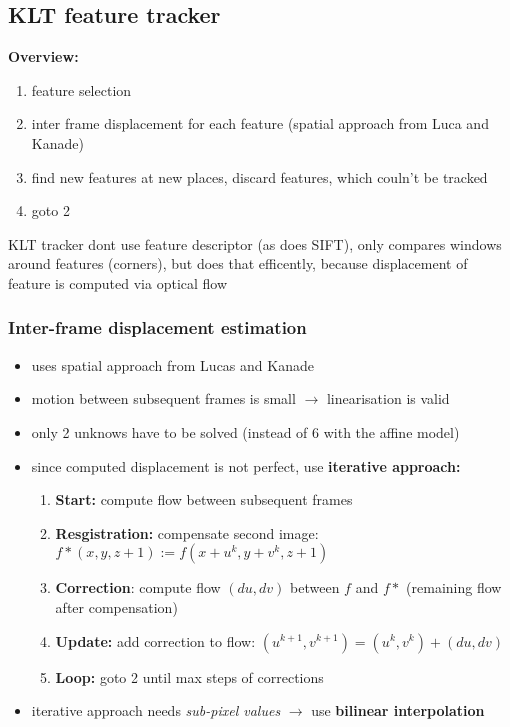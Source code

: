 \documentclass[11pt]{article}
\begin{document}
\subsection{KLT feature tracker}
\label{sec-4-2}
\textbf{Overview:}
\begin{enumerate}
\item feature selection
\item inter frame displacement for each feature (spatial approach from Luca and Kanade)
\item find new features at new places, discard features, which couln't be tracked
\item goto 2
\end{enumerate}
KLT tracker dont use feature descriptor (as does SIFT), only compares windows 
around features (corners), but does that efficently, because displacement
of feature is computed via optical flow

\subsubsection{Inter-frame displacement estimation}
\label{sec-4-2-1}
\begin{itemize}
\item uses spatial approach from Lucas and Kanade
\item motion between subsequent frames is small $\rightarrow$ linearisation is valid
\item only 2 unknows have to be solved (instead of 6 with the affine model)
\item since computed displacement is not perfect, use \textbf{iterative approach:}
\begin{enumerate}
\item \textbf{Start:} compute flow between subsequent frames
\item \textbf{Resgistration:} compensate second image: $f*(x,y,z+1):= f(x+u^k,y+v^k, z+1)$
\item \textbf{Correction}: compute flow $(du,dv)$ between $f$ and $f*$ 
(remaining flow after compensation)
\item \textbf{Update:} add correction to flow: $(u^{k+1},v^{k+1}) = (u^k, v^k)+(du,dv)$
\item \textbf{Loop:} goto 2 until max steps of corrections
\end{enumerate}
\item iterative approach needs \emph{sub-pixel values} $\rightarrow$ use \textbf{bilinear interpolation}
\end{itemize}
\end{document}
